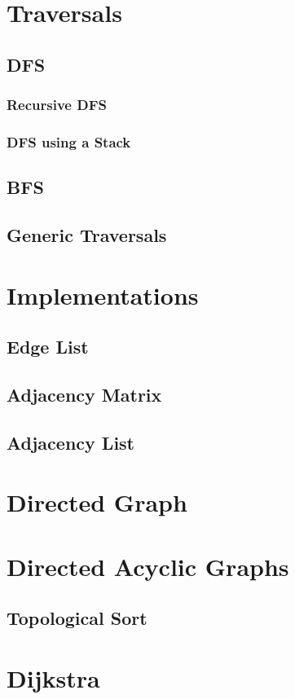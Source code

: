 \documentclass[12pt,a4paper]{article}
\begin{document}
\section{Traversals}
\subsection{DFS}
\subsubsection{Recursive DFS}
\subsubsection{DFS using a Stack}
\subsection{BFS}

\subsection{Generic Traversals}

\section{Implementations}
\subsection{Edge List}
\subsection{Adjacency Matrix}
\subsection{Adjacency List}

\section{Directed Graph}

\section{Directed Acyclic Graphs}
\subsection{Topological Sort}

\section{Dijkstra}
\end{document}
